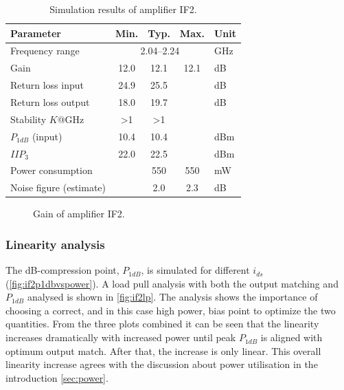 				\begin{table}[hbt!]
					\caption[Simulation results of amplifier IF2.]{Simulation results of amplifier IF2.\disclaimer}
					\label{tab:resultif2}
					\centering
					\begin{tabular}{ l c c c l }\toprule
						Parameter & Min. & Typ. & Max. & Unit \\\midrule
						Frequency range & \multicolumn{3}{c}{2.04--2.24} & GHz \\
						Gain & 12.0 & 12.1 & 12.1 & dB \\
						Return loss input & 24.9 & 25.5 &  & dB \\
						Return loss output & 18.0 & 19.7 &  & dB \\
						Stability $K$@\unit[0--70]{GHz} & >1 & >1 &  &  \\
						$P_{1dB}$ (input) & 10.4 & 10.4 &  & dBm \\
						$IIP_3$ & 22.0 & 22.5 &  & dBm \\
						Power consumption &  & 550 & 550 & mW \\
						Noise figure (estimate) &  & 2.0 & 2.3 & dB \\\bottomrule
					\end{tabular}
				\end{table}

				\begin{figure}[hbt!]
					\centering
					\caption[Amplifier IF2 gain.]{Gain of amplifier IF2.}\label{fig:if2gain}
				\end{figure}

			\subsubsection{Linearity analysis}
				The \unit[1]{dB}-compression point, $P_{1dB}$, is simulated for different $i_{ds}$ (\autoref{fig:if2p1dbvspower}). A load pull analysis with both the output matching and $P_{1dB}$ analysed is shown in \autoref{fig:if2lp}. The analysis shows the importance of choosing a correct, and in this case high power, bias point to optimize the two quantities. From the three plots combined it can be seen that the linearity increases dramatically with increased power until peak $P_{1dB}$ is aligned with optimum output match. After that, the increase is only linear. This overall linearity increase agrees with the discussion about power utilisation in the introduction {\autoref{sec:power}}.


